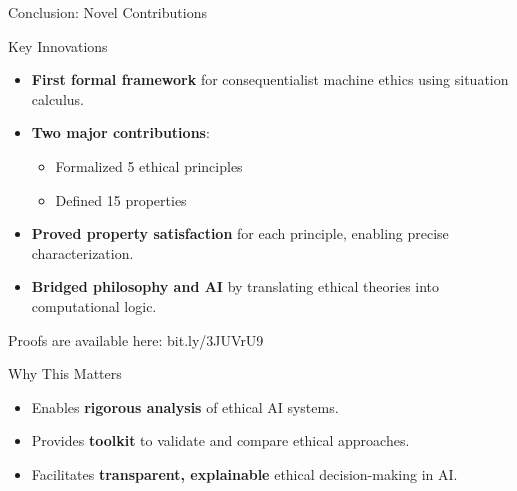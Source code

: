 \documentclass[compress,xcolor=table]{beamer}
\begin{document}
\begin{frame}{Conclusion: Novel Contributions}
    \begin{block}{Key Innovations}
        \begin{itemize}
            \item \textbf{First formal framework} for consequentialist machine ethics using situation calculus.
            \item \textbf{Two major contributions}:
            \begin{itemize}
                \item Formalized 5 ethical principles 
                \item Defined 15 properties 
            \end{itemize}
            \item \textbf{Proved property satisfaction} for each principle, enabling precise characterization.
            \item \textbf{Bridged philosophy and AI} by translating ethical theories into computational logic.
        \end{itemize}

        \tiny
        Proofs are available here: bit.ly/3JUVrU9
    \end{block}

    \begin{block}{Why This Matters}
        \begin{itemize}
            \item Enables \textbf{rigorous analysis} of ethical AI systems.
            \item Provides \textbf{toolkit} to validate and compare ethical approaches.
            \item Facilitates \textbf{transparent, explainable} ethical decision-making in AI.
        \end{itemize}
    \end{block}
\end{frame}
\end{document}
